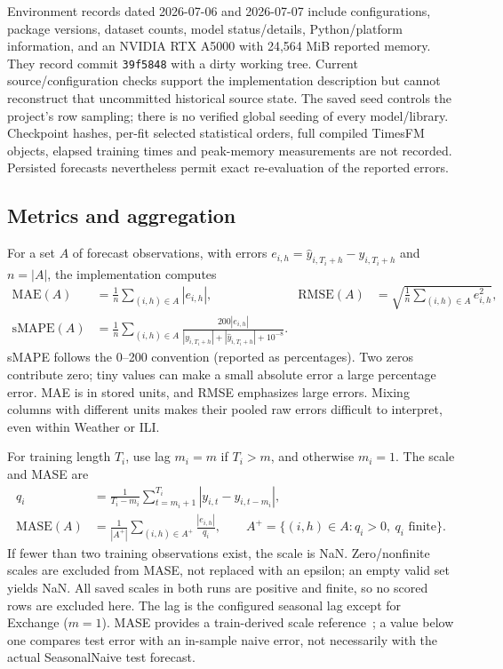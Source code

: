 Environment records dated 2026-07-06 and 2026-07-07 include configurations, package versions, dataset counts, model status/details, Python/platform information, and an NVIDIA RTX A5000 with 24,564 MiB reported memory. They record commit \texttt{39f5848} with a dirty working tree. Current source/configuration checks support the implementation description but cannot reconstruct that uncommitted historical source state. The saved seed controls the project's row sampling; there is no verified global seeding of every model/library. Checkpoint hashes, per-fit selected statistical orders, full compiled TimesFM objects, elapsed training times and peak-memory measurements are not recorded. Persisted forecasts nevertheless permit exact re-evaluation of the reported errors.

\subsection{Metrics and aggregation}\label{sec:metrics}
For a set $A$ of forecast observations, with errors $e_{i,h}=\hat y_{i,T_i+h}-y_{i,T_i+h}$ and $n=|A|$, the implementation computes
\begin{align}
\mathrm{MAE}(A)&=\frac1n\sum_{(i,h)\in A}|e_{i,h}|, &
\mathrm{RMSE}(A)&=\sqrt{\frac1n\sum_{(i,h)\in A}e_{i,h}^{2}},\\
\mathrm{sMAPE}(A)&=\frac1n\sum_{(i,h)\in A}\frac{200|e_{i,h}|}{|y_{i,T_i+h}|+|\hat y_{i,T_i+h}|+10^{-8}}.
\end{align}
sMAPE follows the 0--200 convention (reported as percentages). Two zeros contribute zero; tiny values can make a small absolute error a large percentage error. MAE is in stored units, and RMSE emphasizes large errors. Mixing columns with different units makes their pooled raw errors difficult to interpret, even within Weather or ILI.

For training length $T_i$, use lag $m_i=m$ if $T_i>m$, and otherwise $m_i=1$. The scale and MASE are
\begin{align}
q_i&=\frac{1}{T_i-m_i}\sum_{t=m_i+1}^{T_i}|y_{i,t}-y_{i,t-m_i}|,\\
\mathrm{MASE}(A)&=\frac{1}{|A^+|}\sum_{(i,h)\in A^+}\frac{|e_{i,h}|}{q_i},\qquad
A^+=\{(i,h)\in A:q_i>0,\ q_i\text{ finite}\}.
\end{align}
If fewer than two training observations exist, the scale is NaN. Zero/nonfinite scales are excluded from MASE, not replaced with an epsilon; an empty valid set yields NaN. All saved scales in both runs are positive and finite, so no scored rows are excluded here. The lag is the configured seasonal lag except for Exchange ($m=1$). MASE provides a train-derived scale reference~\cite{mase_paper}; a value below one compares test error with an in-sample naive error, not necessarily with the actual SeasonalNaive test forecast.

